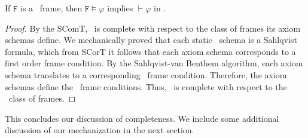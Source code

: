 \begin{theorem}\label{completeness}
	If $\mathtt{F}$ is a \DASL\ frame, then $\mathtt{F}\models \varphi$ implies $\vdash \varphi$ in \DASL.
\end{theorem}
\begin{proof}
	By the SComT, \DASL\ is complete with respect to the class of frames its axiom schemas define. We mechanically proved that each static \DASL\ schema is a Sahlqvist formula, which from SCorT it follows that each axiom schema corresponds to a first order frame condition. By the Sahlqvist-van Benthem algorithm, each axiom schema translates to a corresponding \DASL\ frame condition. Therefore, the axiom schemas define the \DASL\ frame conditions. Thus, \DASL\ is complete with respect to the \DASL\ class of frames.
\end{proof}
%


%
This concludes our discussion of completeness. We include some additional discussion of our mechanization in the next section. 

